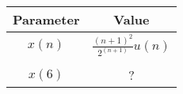  \begin{tabular}{|c|c|}
        \hline
        \textbf{Parameter} & \textbf{Value} \\
        \hline
        \(x(n)\) & \(\frac{(n+1)^2}{2^(n+1)}u(n)\) \\ \\
        \(x(6)\) & ? \\
        \hline
    \end{tabular}

